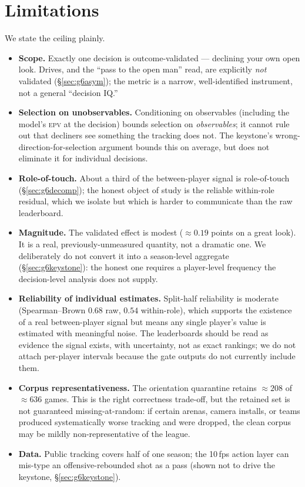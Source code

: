 \documentclass[11pt]{article}
\newcommand{\epv}{\textsc{epv}}
\begin{document}
\section{Limitations}\label{sec:limits}
We state the ceiling plainly.
\begin{itemize}
  \item \textbf{Scope.} Exactly one decision is outcome-validated --- declining your own open look. Drives,
        and the ``pass to the open man'' read, are explicitly \emph{not} validated (\S\ref{sec:g6asym});
        the metric is a narrow, well-identified instrument, not a general ``decision IQ.''
  \item \textbf{Selection on unobservables.} Conditioning on observables (including the model's \epv{} at
        the decision) bounds selection on \emph{observables}; it cannot rule out that decliners see
        something the tracking does not. The keystone's wrong-direction-for-selection argument bounds this
        on average, but does not eliminate it for individual decisions.
  \item \textbf{Role-of-touch.} About a third of the between-player signal is role-of-touch
        (\S\ref{sec:g6decomp}); the honest object of study is the reliable within-role residual, which we
        isolate but which is harder to communicate than the raw leaderboard.
  \item \textbf{Magnitude.} The validated effect is modest ($\approx\!0.19$ points on a great look). It is a
        real, previously-unmeasured quantity, not a dramatic one. We deliberately do not convert it into a
        season-level aggregate (\S\ref{sec:g6keystone}): the honest one requires a player-level frequency
        the decision-level analysis does not supply.
  \item \textbf{Reliability of individual estimates.} Split-half reliability is moderate (Spearman--Brown
        $0.68$ raw, $0.54$ within-role), which supports the existence of a real between-player signal but
        means any single player's value is estimated with meaningful noise. The leaderboards should be read
        as evidence the signal exists, with uncertainty, not as exact rankings; we do not attach per-player
        intervals because the gate outputs do not currently include them.
  \item \textbf{Corpus representativeness.} The orientation quarantine retains $\approx\!208$ of
        $\approx\!636$ games. This is the right correctness trade-off, but the retained set is not
        guaranteed missing-at-random: if certain arenas, camera installs, or teams produced systematically
        worse tracking and were dropped, the clean corpus may be mildly non-representative of the league.
  \item \textbf{Data.} Public tracking covers half of one season; the 10\,fps action layer can mis-type an
        offensive-rebounded shot as a pass (shown not to drive the keystone, \S\ref{sec:g6keystone}).
\end{itemize}
\end{document}
